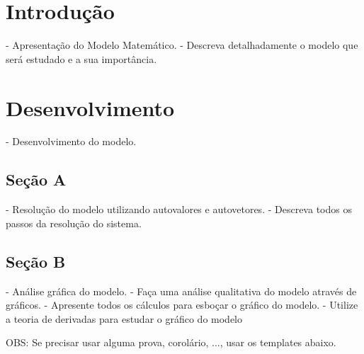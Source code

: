 \documentclass[a4paper,12pt,twoside,portuguese]{all-in-one} %
\author{Andre V. V. Codorniz \\ \texttt{ID} \and Filipe S. Lopes \\ \texttt{ID} \and Heloísa Pazeti \\ \texttt{14577991} \and Lucas M. Farias \\ \texttt{ID} \and Miguel R. Fonseca
 \\ \texttt{14682196} \and Renan C. M. Soares \\ \texttt{ID}}
\begin{document}
\setlength{\baselineskip}{.70cm}

\begin{titlepage}
\maketitle\vfill
\thispagestyle{empty}
\end{titlepage}

\thispagestyle{plain}
\renewcommand*\contentsname{Sumário}
\tableofcontents
\newpage

\pagestyle{\defaultsettings}

\section{Introdução}

- Apresentação do Modelo Matemático.
- Descreva detalhadamente o modelo que será estudado e a sua importância.

\section{Desenvolvimento}

- Desenvolvimento do modelo.

\subsection{Seção A}

- Resolução do modelo utilizando autovalores e autovetores.
- Descreva todos os passos da resolução do sistema.


\subsection{Seção B}

- Análise gráfica do modelo.
- Faça uma análise qualitativa do modelo através de gráficos. 
- Apresente todos os cálculos para esboçar o gráfico do modelo. 
- Utilize a teoria de derivadas para estudar o gráfico do modelo


OBS: Se precisar usar alguma prova, corolário, ..., usar os templates abaixo.
\end{document}

